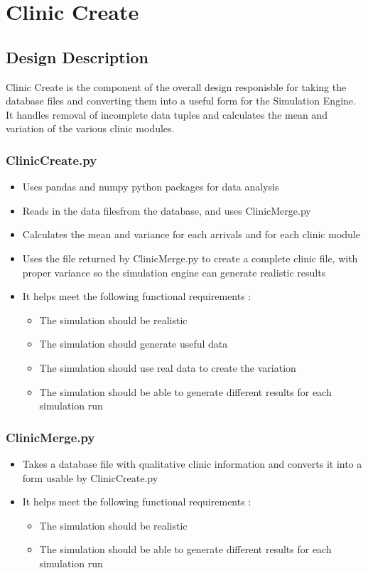 \documentclass[12pt]{article}
\begin{document}
\section{Clinic Create}
\subsection{Design Description}
Clinic Create is the component of the overall design responisble for taking the database files and converting them into a useful form for the Simulation Engine. It handles removal of incomplete data tuples and calculates the mean and variation of the various clinic modules. \\
\subsubsection{ClinicCreate.py}
\begin{itemize}
	\item Uses pandas and numpy python packages for data analysis
	\item Reads in the data filesfrom the database, and uses ClinicMerge.py
	\item Calculates the mean and variance for each arrivals and for each clinic module
	\item Uses the file returned by ClinicMerge.py to create a complete clinic file, with proper variance so the simulation engine can generate realistic results
	\item It helps meet the following functional requirements :
\begin{itemize}
	\item The simulation should be realistic
	\item The simulation should generate useful data 
	\item The simulation should use real data to create the variation
	\item The simulation should be able to generate different results for each simulation run
\end{itemize}
\end{itemize}

\subsubsection{ClinicMerge.py}
\begin{itemize}
	\item Takes a database file with qualitative clinic information and converts it into a form usable by ClinicCreate.py
	\item It helps meet the following functional requirements :
	\begin{itemize}
		\item The simulation should be realistic
		\item The simulation should be able to generate different results for each simulation run
	\end{itemize} 
\end{itemize}
\end{document}
